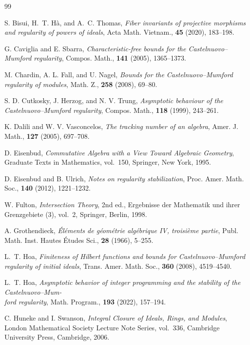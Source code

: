 \documentclass[12pt]{amsart}
\numberwithin{equation}{section}
\theoremstyle{definition}
\theoremstyle{remark}
\numberwithin{equation}{section}
\begin{document}
\begin{thebibliography}{99}
\footnotesize\raggedright
{} S. Bisui, H.~T. H\`a, and A.~C. Thomas,
\emph{Fiber invariants of projective morphisms and regularity of powers of ideals},
Acta Math. Vietnam.,  \textbf{45} (2020),   183--198.

 G. Caviglia and E. Sbarra,
\emph{Characteristic-free bounds for the Castelnuovo--Mumford regularity},
Compos. Math.,  \textbf{141} (2005),   1365--1373.

 M. Chardin, A. L. Fall, and U. Nagel,
\emph{Bounds for the Castelnuovo--Mumford regularity of modules},
Math. Z.,  \textbf{258} (2008), 69--80.

 S. D. Cutkosky, J. Herzog, and N. V. Trung,
\emph{Asymptotic behaviour of the Castelnuovo--Mumford regularity},
Compos. Math.,  \textbf{118} (1999), 243--261.

 K. Dalili and W. V. Vasconcelos,
\emph{The tracking number of an algebra},
Amer. J. Math., \textbf{127} (2005), 697--708.

 D. Eisenbud,
\emph{Commutative Algebra with a View Toward Algebraic Geometry},
Graduate Texts in Mathematics, vol.~150, Springer, New York, 1995.

 D. Eisenbud and B. Ulrich,
\emph{Notes on regularity stabilization},
Proc. Amer. Math. Soc.,  \textbf{140} (2012), 1221--1232.

 W. Fulton,
\emph{Intersection Theory}, 2nd ed.,
Ergebnisse der Mathematik und ihrer Grenzgebiete (3), vol.~2,
Springer, Berlin, 1998.

 A. Grothendieck,
\emph{\'El\'ements de g\'eom\'etrie alg\'ebrique IV, troisi\`eme partie},
Publ. Math. Inst. Hautes \'Etudes Sci.,  \textbf{28} (1966), 5--255.

 L.~T. Hoa,
\emph{Finiteness of Hilbert functions and bounds for
Castelnuovo--Mumford regularity of initial ideals},
Trans. Amer. Math. Soc.,  \textbf{360} (2008),   4519--4540.

 L.~T. Hoa,
\emph{Asymptotic behavior of integer programming and the stability of the Castelnuovo--Mum-\\ ford regularity},
Math. Program.,  \textbf{193} (2022), 157--194.

 C. Huneke and I. Swanson,
\emph{Integral Closure of Ideals, Rings, and Modules},
London Mathematical Society Lecture Note Series, vol.~336,
Cambridge University Press, Cambridge, 2006.


\end{thebibliography}
\end{document}
